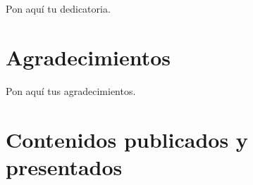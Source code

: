 \documentclass[12pt]{report} %
\begin{document}
\newpage
\thispagestyle{empty}
\begin{flushright}
Pon aquí tu dedicatoria.
\end{flushright}

\chapter*{Agradecimientos}
\thispagestyle{empty}
Pon aquí tus agradecimientos. 

\chapter*{Contenidos publicados y presentados}
\thispagestyle{empty}
\end{document}
